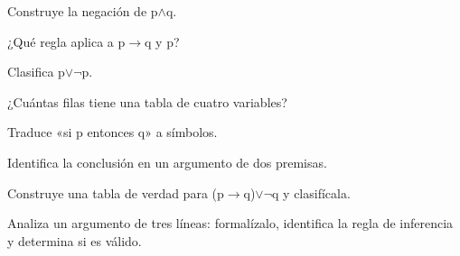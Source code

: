 \begin{activity}[id=dia-28-corta-01,type=short,weight=1]

Construye la negación de p\(\land\)q.

\end{activity}

\begin{activity}[id=dia-28-corta-02,type=short,weight=1]

¿Qué regla aplica a p\(\to\)q y p?

\end{activity}

\begin{activity}[id=dia-28-corta-03,type=short,weight=1]

Clasifica p\(\lor\)\(\neg\)p.

\end{activity}

\begin{activity}[id=dia-28-corta-04,type=short,weight=1]

¿Cuántas filas tiene una tabla de cuatro variables?

\end{activity}

\begin{activity}[id=dia-28-corta-05,type=short,weight=1]

Traduce «si p entonces q» a símbolos.

\end{activity}

\begin{activity}[id=dia-28-corta-06,type=short,weight=1]

Identifica la conclusión en un argumento de dos premisas.

\end{activity}

\begin{activity}[id=dia-28-desarrollo-01,type=long,weight=2]

Construye una tabla de verdad para (p\(\to\)q)\(\lor\)\(\neg\)q y clasifícala.

\end{activity}

\begin{activity}[id=dia-28-desarrollo-02,type=long,weight=2]

Analiza un argumento de tres líneas: formalízalo, identifica la regla de inferencia y determina si es válido.

\end{activity}


